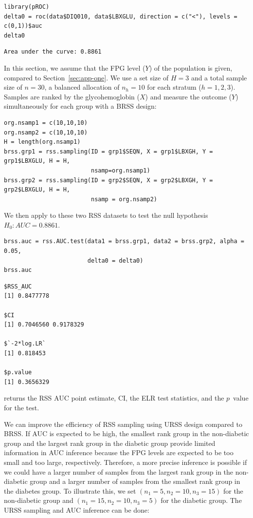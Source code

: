 \begin{verbatim}
library(pROC)
delta0 = roc(data$DIQ010, data$LBXGLU, direction = c("<"), levels = c(0,1))$auc
delta0
\end{verbatim}
\begin{verbatim}
Area under the curve: 0.8861
\end{verbatim}

%
In this section, we assume that the FPG level ($Y$) of the population is given, compared to Section~\ref{sec:app-one}. We use a set size of $H=3$ and a total sample size of $n=30$, a balanced allocation of $n_h=10$ for each stratum ($h=1, 2, 3$). Samples are ranked by the glycohemoglobin ($X$) and measure the outcome ($Y$) simultaneously for each group with a BRSS design:

\begin{verbatim}
org.nsamp1 = c(10,10,10)
org.nsamp2 = c(10,10,10)
H = length(org.nsamp1)
brss.grp1 = rss.sampling(ID = grp1$SEQN, X = grp1$LBXGH, Y = grp1$LBXGLU, H = H,
                         nsamp=org.nsamp1)
brss.grp2 = rss.sampling(ID = grp2$SEQN, X = grp2$LBXGH, Y = grp2$LBXGLU, H = H, 
                         nsamp = org.nsamp2)
\end{verbatim}

%
We then apply  to these two RSS datasets to test the null hypothesis $H_0: AUC=0.8861$.
%

\begin{verbatim}
brss.auc = rss.AUC.test(data1 = brss.grp1, data2 = brss.grp2, alpha = 0.05, 
                        delta0 = delta0)
brss.auc
\end{verbatim}
\begin{verbatim}
$RSS_AUC
[1] 0.8477778

$CI
[1] 0.7046560 0.9178329

$`-2*log.LR`
[1] 0.818453

$p.value
[1] 0.3656329
\end{verbatim}
%
 returns the RSS AUC point estimate, CI, the ELR test statistics, and the $p$~value for the test.

We can improve the efficiency of RSS sampling using URSS design compared to BRSS. If AUC is expected to be high, the smallest rank group in the non-diabetic group and the largest rank group in the diabetic group provide limited information in AUC inference because the FPG levels are expected to be too small and too large, respectively. Therefore, a more precise inference is possible if we could have a larger number of samples from the largest rank group in the non-diabetic group and a larger number of samples from the smallest rank group in the diabetes group. To illustrate this, we set $(n_1=5, n_2=10, n_3=15)$ for the non-diabetic group and $(n_1=15, n_2=10, n_3=5)$ for the diabetic group. The URSS sampling and AUC inference can be done:
%

